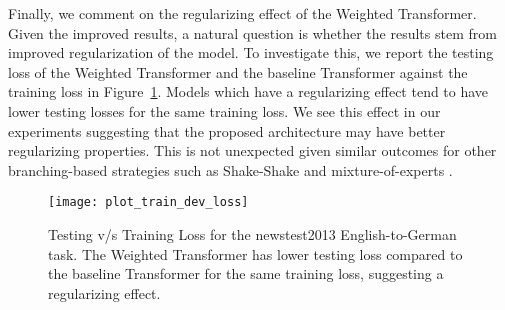 \documentclass{article} \usepackage{iclr2018_conference,times}
\newcommand{\name}{Weighted Transformer\xspace}
\begin{document}
\iffalse 

Next, we report the rate of convergence for the two models on the news2013 English-to-German task in Figure~\ref{fig:convergence}. It is evident from the figure that the proposed branching strategy accelerates the convergence of the model. Given that the total number of parameters in both models is roughly equal, the reduced number of iterations also translates into reduction in time needed for convergence. In our experiments, we found that limiting the total number of iterations to  of those required by the baseline Transformer sufficed. 
\begin{figure}
\begin{center}
\fbox{\rule[-.5cm]{0cm}{4cm} \rule[-.5cm]{4cm}{0cm}}
\end{center}
\caption{Rate of convergence of training and test loss for the baseline and Weighted Transformer on the newstest2013 English-to-German task. \label{fig:convergence}}
\end{figure}


\fi 

Finally, we comment on the regularizing effect of the \name.  Given the improved results, a natural question is whether the results stem from improved regularization of the model. To investigate this, we report the testing loss of the \name and the baseline Transformer against the training loss in Figure~\ref{fig:regu}. Models which have a regularizing effect tend to have lower testing losses for the same training loss. We see this effect in our experiments suggesting that the proposed architecture may have better regularizing properties. This is not unexpected given similar outcomes for other branching-based strategies such as Shake-Shake \cite{gastaldi2017shake} and mixture-of-experts \cite{shazeer2017outrageously}.



\begin{figure}
\begin{center}


\texttt{[image: plot\_train\_dev\_loss]}
\end{center}
\caption{Testing v/s Training Loss for the newstest2013 English-to-German task. The \name has lower testing loss compared to the baseline Transformer for the same training loss, suggesting a regularizing effect.  \label{fig:regu}}
\end{figure}
\end{document}
